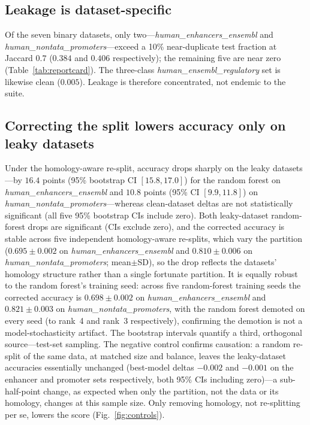 \documentclass[webpdf,modern,large,namedate]{oup-authoring-template}%
\begin{document}
\subsection{Leakage is dataset-specific}
Of the seven binary datasets, only two---\textit{human\_enhancers\_ensembl} and \textit{human\_nontata\_promoters}---exceed a 10\% near-duplicate test fraction at Jaccard $0.7$ ($0.384$ and $0.406$ respectively); the remaining five are near zero (Table~\ref{tab:reportcard}). The three-class \textit{human\_ensembl\_regulatory} set is likewise clean ($0.005$). Leakage is therefore concentrated, not endemic to the suite.

\subsection{Correcting the split lowers accuracy only on leaky datasets}
Under the homology-aware re-split, accuracy drops sharply on the leaky datasets---by $16.4$ points (95\% bootstrap CI $[15.8, 17.0]$) for the random forest on \textit{human\_enhancers\_ensembl} and $10.8$ points (95\% CI $[9.9, 11.8]$) on \textit{human\_nontata\_promoters}---whereas clean-dataset deltas are not statistically significant (all five 95\% bootstrap CIs include zero). Both leaky-dataset random-forest drops are significant (CIs exclude zero), and the corrected accuracy is stable across five independent homology-aware re-splits, which vary the partition ($0.695\pm0.002$ on \textit{human\_enhancers\_ensembl} and $0.810\pm0.006$ on \textit{human\_nontata\_promoters}; mean$\pm$SD), so the drop reflects the datasets' homology structure rather than a single fortunate partition. It is equally robust to the random forest's training seed: across five random-forest training seeds the corrected accuracy is $0.698\pm0.002$ on \textit{human\_enhancers\_ensembl} and $0.821\pm0.003$ on \textit{human\_nontata\_promoters}, with the random forest demoted on every seed (to rank~4 and rank~3 respectively), confirming the demotion is not a model-stochasticity artifact. The bootstrap intervals quantify a third, orthogonal source---test-set sampling. The negative control confirms causation: a random re-split of the same data, at matched size and balance, leaves the leaky-dataset accuracies essentially unchanged (best-model deltas $-0.002$ and $-0.001$ on the enhancer and promoter sets respectively, both 95\% CIs including zero)---a sub-half-point change, as expected when only the partition, not the data or its homology, changes at this sample size. Only removing homology, not re-splitting per se, lowers the score (Fig.~\ref{fig:controls}).
\end{document}
